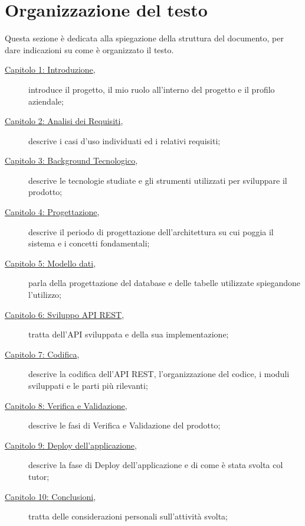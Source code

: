 \section{Organizzazione del testo}
Questa sezione è dedicata alla spiegazione della struttura del documento, per dare indicazioni su come è organizzato il testo.
\begin{description}

\item [{\hyperref[cap:introduzione]{Capitolo 1: Introduzione}},] introduce il progetto, il mio ruolo all'interno del progetto e il profilo aziendale;

    \item [{\hyperref[cap:analisi-requisiti]{Capitolo 2: Analisi dei Requisiti}},] descrive i casi d'uso individuati ed i relativi requisiti;
    
    \item[{\hyperref[cap:tecnologie]{Capitolo 3: Background Tecnologico}},] descrive le tecnologie studiate e gli strumenti utilizzati per sviluppare il prodotto;
    
    \item[{\hyperref[cap:progettazione]{Capitolo 4: Progettazione}},] descrive il periodo di progettazione dell'architettura su cui poggia il sistema e i concetti fondamentali;
    
    \item[{\hyperref[cap:database]{Capitolo 5: Modello dati}},] parla della progettazione del database e delle tabelle utilizzate spiegandone l'utilizzo;
    
    \item[{\hyperref[cap:api-rest]{Capitolo 6: Sviluppo API REST}},] tratta dell'API sviluppata e della sua implementazione;
    
    \item[{\hyperref[cap:codifica]{Capitolo 7: Codifica}},] descrive la codifica dell'API REST, l'organizzazione del codice, i moduli sviluppati e le parti più rilevanti;
    
    \item[{\hyperref[cap:verifica-validazione]{Capitolo 8: Verifica e Validazione}},] descrive le fasi di Verifica e Validazione del prodotto;
    
    \item[{\hyperref[cap:deploy]{Capitolo 9: Deploy dell'applicazione}},] descrive la fase di Deploy dell'applicazione e di come è stata svolta col tutor;
    
    \item[{\hyperref[cap:conclusioni]{Capitolo 10: Conclusioni}},] tratta delle considerazioni personali sull'attività svolta;
    
\end{description}

